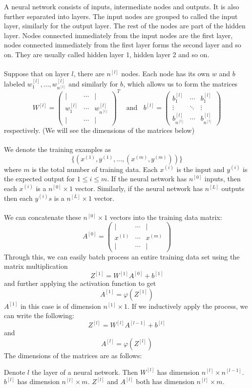 \documentclass[a4paper]{article}
\begin{document}
A neural network consists of inputs, intermediate nodes and outputs. It is also further separated into layers. The input nodes are grouped to called the input layer, similarly for the output layer. The rest of the nodes are part of the hidden layer. Nodes connected immediately from the input nodes are the first layer, nodes connected immediately from the first layer forms the second layer and so on. They are usually called hidden layer 1, hidden layer 2 and so on. \\~\\

Suppose that on layer $l$, there are $n^{[l]}$ nodes. Each node has its own $w$ and $b$ labeled $w_1^{[l]},\dots,w_{n^{[l]}}^{[l]}$ and similarly for $b$, which allows us to form the matrices $$W^{[l]}=\begin{pmatrix}
| & \cdots & |\\
w_1^{[l]} & \cdots & w_{n^{[l]}}^{[l]}\\
| & \cdots & |
\end{pmatrix}^T\;\;\text{ and }\;\;b^{[l]}=\begin{pmatrix}
b_1^{[l]} & \cdots & b_1^{[l]}\\
\vdots & \ddots & \vdots\\
b_{n^{[l]}}^{[l]} & \cdots & b_{n^{[l]}}^{[l]}
\end{pmatrix}$$ respectively. (We will see the dimensions of the matrices below) \\~\\

We denote the training examples as $$\{(x^{(1)}, y^{(1)},\dots,(x^{(m)},y^{(m)}))\}$$ where $m$ is the total number of training data. Each $x^{(i)}$ is the input and $y^{(i)}$ is the expected output for $1\leq i\leq m$. If the neural network has $n^{[0]}$ inputs, then each $x^{(i)}$ is a $n^{[0]}\times 1$ vector. Similarly, if the neural network has $n^{[L]}$ outputs then each $y^{(i)}s$ is a $n^{[L]}\times 1$ vector. \\~\\

We can concatenate these $n^{[0]}\times 1$ vectors into the training data matrix: $$A^{[0]}=\begin{pmatrix}
| & \cdots & |\\
x^{(1)} & \cdots & x^{(m)}\\
| & \cdots & |
\end{pmatrix}$$ Through this, we can easily batch process an entire training data set using the matrix multiplication $$Z^{[1]}=W^{[1]}A^{[0]}+b^{[1]}$$ and further applying the activation function to get $$A^{[1]}=\varphi(Z^{[1]})$$ $A^{[1]}$ in this case is of dimension $n^{[1]}\times 1$. If we inductively apply the process, we can write the following: $$Z^{[l]}=W^{[l]}A^{[l-1]}+b^{[l]}$$ and $$A^{[l]}=\varphi(Z^{[l]})$$ The dimensions of the matrices are as follows: 
\begin{thm}{}{} Denote $l$ the layer of a neural network. Then $W^{[l]}$ has dimension $n^{[l]}\times n^{[l-1]}$. $b^{[l]}$ has dimension $n^{[l]}\times m$. $Z^{[l]}$ and $A^{[l]}$ both has dimension $n^{[l]}\times m$. 
\end{thm}
\end{document}
